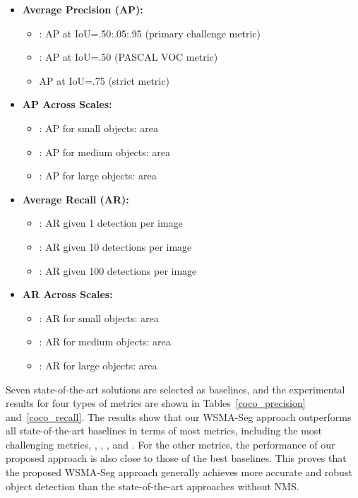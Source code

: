 \documentclass{article}
\begin{document}
\begin{small}
\begin{itemize}
  \item \textbf{Average Precision (AP):}
  \begin{itemize}[noitemsep]
     \item : AP at IoU=.50:.05:.95 (primary challenge metric)
     \item : AP at IoU=.50 (PASCAL VOC metric)
     \item AP at IoU=.75 (strict metric)
  \end{itemize}
  \item \textbf{AP Across Scales:}
  \begin{itemize}[noitemsep]
     \item : AP for small objects: area  
     \item : AP for medium objects:   area  
     \item  : AP for large objects: area  
  \end{itemize}
  \item \textbf{Average Recall (AR):}
  \begin{itemize}[noitemsep]
     \item  : AR given 1 detection per image
     \item  : AR given 10 detections per image
     \item  : AR given 100 detections per image
  \end{itemize}
  \item \textbf{AR Across Scales:}
  \begin{itemize}[noitemsep]
     \item  : AR for small objects: area  
     \item  : AR for medium objects:  area 
     \item  : AR for large objects: area
  \end{itemize}
\end{itemize}
\end{small}
Seven state-of-the-art solutions are selected as baselines, and the experimental results for four types of metrics are shown in Tables~\ref{coco_precision} and~\ref{coco_recall}. The results show that our WSMA-Seg approach outperforms all state-of-the-art baselines in terms of most metrics, including the most challenging metrics, , , , and . For the other metrics, the performance of our proposed approach is also close to those of the best baselines. This proves that the proposed WSMA-Seg
approach generally achieves more accurate and robust object detection than the state-of-the-art approaches without NMS.
\end{document}
